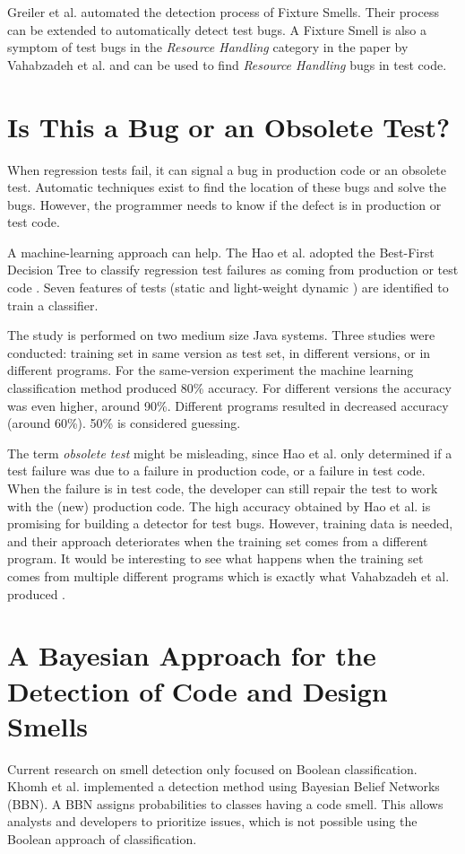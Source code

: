 \documentclass{uvamscse}
\newcommand{\Atestbugs}{Vahabzadeh et al.}
\newcommand{\Afixture}{Greiler et al.}
\newcommand{\Aobsolete}{Hao et al.}
\begin{document}
\Afixture{} automated the detection process of Fixture Smells. Their process can be extended to automatically detect test bugs. A Fixture Smell is also a symptom of test bugs in the \textit{Resource Handling} category in the paper by \Atestbugs{} and can be used to find \textit{Resource Handling} bugs in test code.

\section{Is This a Bug or an Obsolete Test?}
When regression tests fail, it can signal a bug in production code or an obsolete test. Automatic techniques exist to find the location of these bugs and solve the bugs. However, the programmer needs to know if the defect is in production or test code. 

A machine-learning approach can help. The \Aobsolete{} adopted the Best-First Decision Tree to classify regression test failures as coming from production or test code \cite{hao2013bug}. Seven features of tests (static and light-weight dynamic ) are identified to train a classifier.  

The study is performed on two medium size Java systems. Three studies were conducted: training set in same version as test set, in different versions, or in different programs. For the same-version experiment the machine learning classification method produced 80\% accuracy. For different versions the accuracy was even higher, around 90\%. Different programs resulted in decreased accuracy (around 60\%). 50\% is considered guessing.

The term \textit{obsolete test} might be misleading, since \Aobsolete{} only determined if a test failure was due to a failure in production code, or a failure in test code. When the failure is in test code, the developer can still repair the test to work with the (new) production code. The high accuracy obtained by \Aobsolete{} is promising for building a detector for test bugs. However, training data is needed, and their approach deteriorates when the training set comes from a different program. It would be interesting to see what happens when the training set comes from multiple different programs which is exactly what \Atestbugs{} produced
. 
\section{A Bayesian Approach for the Detection of Code and Design Smells}
Current research on smell detection only focused on Boolean classification. Khomh et al. implemented a detection method using Bayesian Belief Networks (BBN)\cite{khomh2009bayesian}. A BBN assigns probabilities to classes having a code smell. This allows analysts and developers to prioritize issues, which is not possible using the Boolean approach of classification. 
\end{document}
